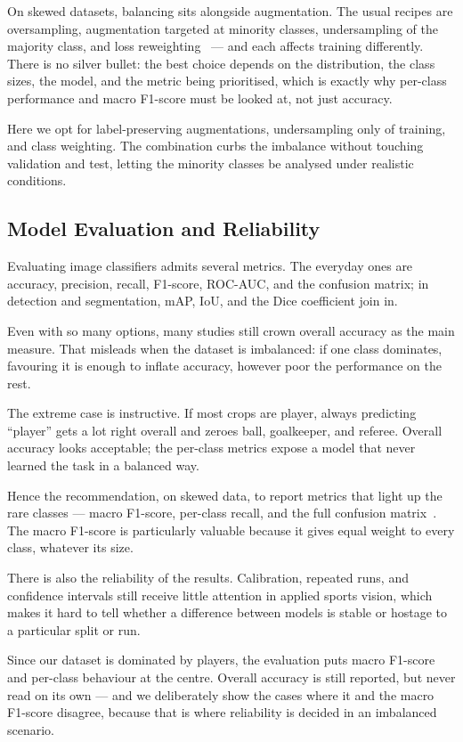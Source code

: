 \documentclass[preprint,12pt]{elsarticle}
\begin{document}
On skewed datasets, balancing sits alongside augmentation. The usual recipes are oversampling, augmentation targeted at minority classes, undersampling of the majority class, and loss reweighting~\cite{ghosh2024imbalance} --- and each affects training differently. There is no silver bullet: the best choice depends on the distribution, the class sizes, the model, and the metric being prioritised, which is exactly why per-class performance and macro F1-score must be looked at, not just accuracy.

Here we opt for label-preserving augmentations, undersampling only of training, and class weighting. The combination curbs the imbalance without touching validation and test, letting the minority classes be analysed under realistic conditions.

\subsection{Model Evaluation and Reliability}

Evaluating image classifiers admits several metrics. The everyday ones are accuracy, precision, recall, F1-score, ROC-AUC, and the confusion matrix; in detection and segmentation, mAP, IoU, and the Dice coefficient join in.

Even with so many options, many studies still crown overall accuracy as the main measure. That misleads when the dataset is imbalanced: if one class dominates, favouring it is enough to inflate accuracy, however poor the performance on the rest.

The extreme case is instructive. If most crops are player, always predicting ``player'' gets a lot right overall and zeroes ball, goalkeeper, and referee. Overall accuracy looks acceptable; the per-class metrics expose a model that never learned the task in a balanced way.

Hence the recommendation, on skewed data, to report metrics that light up the rare classes --- macro F1-score, per-class recall, and the full confusion matrix~\cite{ghosh2024imbalance}. The macro F1-score is particularly valuable because it gives equal weight to every class, whatever its size.

There is also the reliability of the results. Calibration, repeated runs, and confidence intervals still receive little attention in applied sports vision, which makes it hard to tell whether a difference between models is stable or hostage to a particular split or run.

Since our dataset is dominated by players, the evaluation puts macro F1-score and per-class behaviour at the centre. Overall accuracy is still reported, but never read on its own --- and we deliberately show the cases where it and the macro F1-score disagree, because that is where reliability is decided in an imbalanced scenario.
\end{document}
